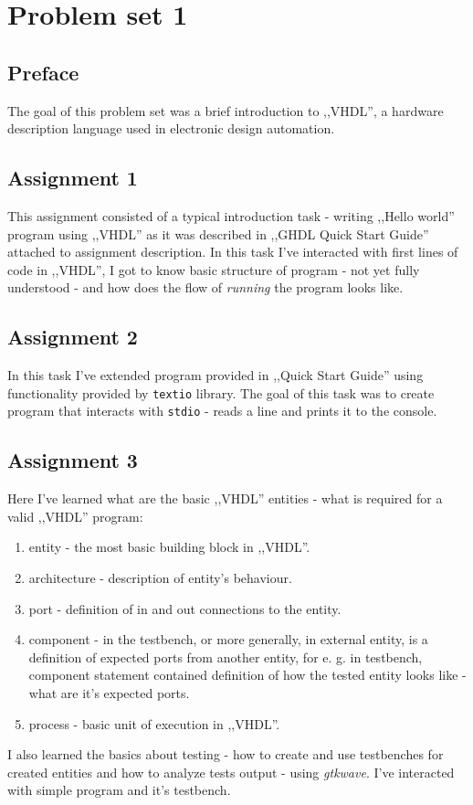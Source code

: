 \section{Problem set 1}
\subsection{Preface}

The goal of this problem set was a brief introduction to ,,VHDL'', a hardware
description language used in electronic design automation.

\subsection{Assignment 1}

This assignment consisted of a typical introduction task - writing
,,Hello world'' program using ,,VHDL'' as it was described in ,,GHDL Quick Start
Guide'' attached to assignment description. In this task I've interacted
with first lines of code in ,,VHDL'', I got to know basic structure of program
- not yet fully understood - and how does the flow of \textit{running} the
program looks like.

\subsection{Assignment 2}

In this task I've extended program provided in ,,Quick Start Guide'' using
functionality provided by \texttt{textio} library. The goal of this task was to
create program that interacts with \texttt{stdio} - reads a line and prints it
to the console.

\subsection{Assignment 3}

Here I've learned what are the basic ,,VHDL'' entities - what is required for
a valid ,,VHDL'' program:
\begin{enumerate}
  \item entity - the most basic building block in ,,VHDL''.
  \item architecture - description of entity's behaviour.
  \item port - definition of in and out connections to the entity.
  \item component - in the testbench, or more generally, in external entity,
        is a definition of expected ports from another entity, for e. g.
        in testbench, component statement contained definition of how the
        tested entity looks like - what are it's expected ports.
  \item process - basic unit of execution in ,,VHDL''.
\end{enumerate}
I also learned the basics about testing - how to create and use testbenches
for created entities and how to analyze tests output - using \textit{gtkwave}.
I've interacted with simple program and it's testbench.

